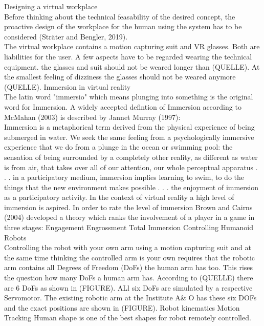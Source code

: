 Designing a virtual workplace\\
Before thinking about the technical feasability of the desired concept, the proactive design of the workplace for the human using the system has to be considered (Sträter and Bengler, 2019). \\
The virtual workplace contains a motion capturing suit and VR glasses. Both are liabilities for the user. A few aspects have to be regarded wearing the technical equipment. the glasses and suit should not be weared longer than (QUELLE). At the smallest feeling of dizziness the glasses should not be weared anymore (QUELLE). 
Immersion in virtual reality\\
The latin word "immersio" which means plunging into something is the original word for Immersion. A widely accepted defintion of Immersion according to McMahan (2003) is described by Jannet Murray (1997):\\
 Immersion is a metaphorical term derived from the physical experience of being submerged in water. We seek the same feeling from a psychologically immersive experience that we do from a plunge in the ocean or swimming pool: the sensation of being surrounded by a completely other reality, as different as water is from air, that takes over all of our attention, our whole perceptual apparatus . . . in a participatory medium, immersion implies learning to swim, to do the things that the new environment makes possible . . . the enjoyment of immersion as a participatory activity.
In the context of virtual reality a high level of immersion is aspired. In order to rate the level of immersion Brown and Cairns (2004) developed a theory which ranks the involvement of a player in a game in three stages:
Engagement
Engrossment
Total Immersion
Controlling Humanoid Robots\\
Controlling the robot with your own arm using a motion capturing suit and at the same time thinking the controlled arm is your own requires that the robotic arm contains all Degrees of Freedom (DoFs) the human arm has too. This rises the question how many DoFs a human arm has. According to (QUELLE) there are 6 DoFs as shown in (FIGURE). ALl six DoFs are simulated by a respective Servomotor. The existing robotic arm at the Institute A\& O has these six DOFs and the exact positions are shown in (FIGURE).
Robot kinematics
Motion Tracking
Human shape is one of the best shapes for robot remotely controlled.\cite{ieee_industrial_electronics_society_mfi_2003} 